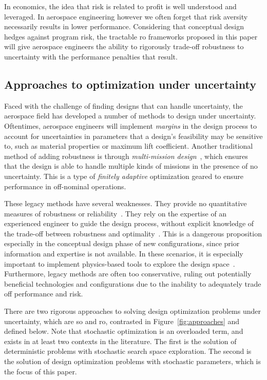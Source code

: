 In economics, the idea that risk is related to profit is well understood and leveraged.
In aerospace engineering however we often forget that risk aversity necessarily results in lower performance.
Considering that conceptual design hedges against program risk,
the tractable \gls{ro} frameworks proposed in this paper will
give aerospace engineers the ability to rigorously trade-off robustness to uncertainty with the performance penalties
that result.

\subsection{Approaches to optimization under uncertainty}
\label{sec:approaches}

Faced with the challenge of finding designs that can handle uncertainty,
the aerospace field has developed a number of methods to
design under uncertainty. Oftentimes, aerospace engineers will implement
\emph{margins} in the design process to account for uncertainties in parameters that a design's feasibility
may be sensitive to, such as material properties or maximum lift coefficient.
Another traditional method of adding robustness is through \emph{multi-mission design}~\cite{York2018},
which ensures that the design is able to handle
multiple kinds of missions in the presence of no uncertainty. This is a type of \emph{finitely
adaptive} optimization geared to ensure performance in off-nominal operations.

These legacy methods have several weaknesses. They provide no quantitative measures of
robustness or reliability~\cite{Zang2002}. They rely on the expertise of an experienced
engineer to guide the design process, without explicit knowledge of the trade-off between
robustness and optimality~\cite{Yao2011}. This is a dangerous proposition especially in the
conceptual design phase of new configurations, since prior information and expertise is not
available. In these scenarios, it is especially important to implement physics-based tools
to explore the design space~\cite{York2018}. Furthermore,
legacy methods are often too conservative, ruling out potentially beneficial technologies
and configurations due to the inability to adequately trade off performance and risk.

There are two rigorous approaches to solving design optimization problems under uncertainty,
which are \gls{so} and \gls{ro}, {\color{blue}contrasted in Figure~\ref{fig:approaches} and defined below}.
Note that stochastic
optimization is an overloaded term, and exists in at least two contexts in the literature. The first is the solution
of deterministic problems with stochastic search space exploration. The second is the solution
of design optimization problems with stochastic parameters, which is the focus of this paper.

